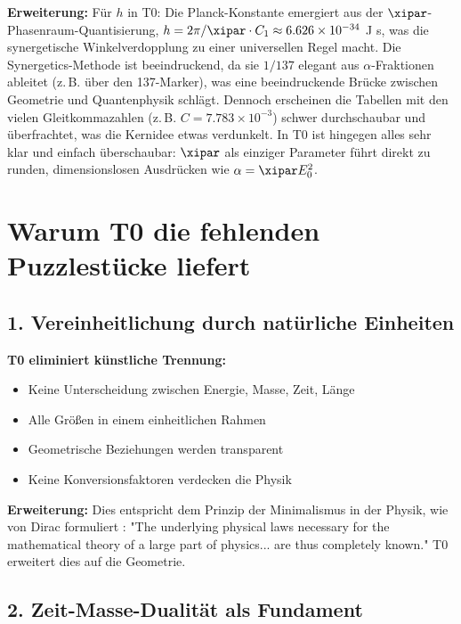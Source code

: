 	\textbf{Erweiterung:} Für $h$ in T0: Die Planck-Konstante emergiert aus der $\xipar$-Phasenraum-Quantisierung, $h = 2\pi / \xipar \cdot C_1 \approx 6.626 \times 10^{-34}$ J s, was die synergetische Winkelverdopplung zu einer universellen Regel macht. Die Synergetics-Methode ist beeindruckend, da sie $1/137$ elegant aus $\alpha$-Fraktionen ableitet (z.\,B. über den 137-Marker), was eine beeindruckende Brücke zwischen Geometrie und Quantenphysik schlägt. Dennoch erscheinen die Tabellen mit den vielen Gleitkommazahlen (z.\,B. $C = 7.783 \times 10^{-3}$) schwer durchschaubar und überfrachtet, was die Kernidee etwas verdunkelt. In T0 ist hingegen alles sehr klar und einfach überschaubar: $\xipar$ als einziger Parameter führt direkt zu runden, dimensionslosen Ausdrücken wie $\alpha = \xipar E_0^2$.
	
	\section{Warum T0 die fehlenden Puzzlestücke liefert}
	
	\subsection{1. Vereinheitlichung durch natürliche Einheiten}
	
	\begin{vorteil}
		\textbf{T0 eliminiert künstliche Trennung:}
		\begin{itemize}
			\item Keine Unterscheidung zwischen Energie, Masse, Zeit, Länge
			\item Alle Größen in einem einheitlichen Rahmen
			\item Geometrische Beziehungen werden transparent
			\item Keine Konversionsfaktoren verdecken die Physik
		\end{itemize}
		
		\textbf{Erweiterung:} Dies entspricht dem Prinzip der Minimalismus in der Physik, wie von Dirac formuliert \cite{dirac_principles}: "The underlying physical laws necessary for the mathematical theory of a large part of physics... are thus completely known." T0 erweitert dies auf die Geometrie.
	\end{vorteil}
	
	\subsection{2. Zeit-Masse-Dualität als Fundament}
	
